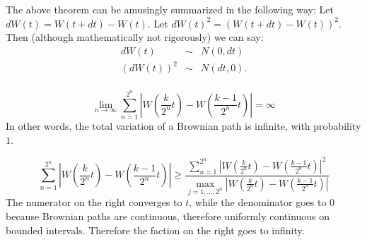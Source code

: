 \begin{problem}
 The above theorem can be amusingly summarized in the following
  way:  Let $dW(t) = W(t + dt) - W(t)$.  Let $dW(t)^2 = ( W(t + dt) -
  W(t) )^2.$  Then (although mathematically not rigorously) we can say:
  \begin{eqnarray*}
     dW(t) &\sim& N(0, dt) \\
     (dW(t))^2 &\sim& N(dt, 0). \\
  \end{eqnarray*}

  \begin{theorem}
  $$
   \lim_{n \to \infty}
            \sum_{n=1}^{2^n}
              \left|
                 W\left( \frac{k}{2^n} t \right) -
                 W\left( \frac{k-1}{2^n} t \right)
              \right|
          = \infty
  $$
  In other words, the total variation of a Brownian path is infinite,
  with probability $1$.
  \end{theorem}


\begin{sol}
$$
    \sum_{n=1}^{2^n}
      \left|
         W\left(  \frac{k}{2^n} t \right) -
         W\left( \frac{k-1}{2^n} t \right)
      \right|
   \ge
   \frac{
                 \sum_{n=1}^{2^n}
      \left|
         W\left(  \frac{k}{2^n} t \right) -
         W\left( \frac{k-1}{2^n} t \right)
      \right|^2
       }{
\max_{j=1, \ldots, 2^n} \left|
         W\left(  \frac{k}{2^n} t \right) -
         W\left( \frac{k-1}{2^n} t \right)
      \right|
     }
$$
The numerator on the right converges to $t$, while the denominator
goes to $0$ because Brownian paths are continuous, therefore
uniformly continuous on bounded intervals.  Therefore the faction
on the right goes to infinity.
\end{sol}
\end{problem}

